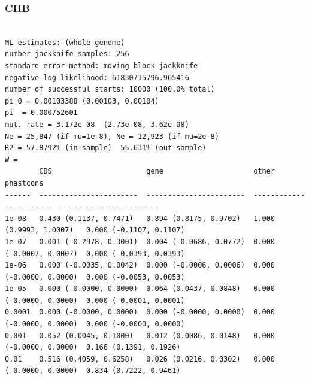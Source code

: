 \documentclass[11pt]{article}
\begin{document}
\subsubsection*{CHB}
\begin{minipage}{\linewidth}\begin{footnotesize}
\begin{verbatim}

ML estimates: (whole genome)
number jackknife samples: 256
standard error method: moving block jackknife
negative log-likelihood: 61830715796.965416
number of successful starts: 10000 (100.0% total)
pi_0 = 0.00103388 (0.00103, 0.00104)
pi  = 0.000752601
mut. rate = 3.172e-08  (2.73e-08, 3.62e-08)
Ne = 25,847 (if mu=1e-8), Ne = 12,923 (if mu=2e-8)
R2 = 57.8792% (in-sample)  55.631% (out-sample)
W = 
        CDS                      gene                     other                    phastcons
------  -----------------------  -----------------------  -----------------------  -----------------------
1e-08   0.430 (0.1137, 0.7471)   0.894 (0.8175, 0.9702)   1.000 (0.9993, 1.0007)   0.000 (-0.1107, 0.1107)
1e-07   0.001 (-0.2978, 0.3001)  0.004 (-0.0686, 0.0772)  0.000 (-0.0007, 0.0007)  0.000 (-0.0393, 0.0393)
1e-06   0.000 (-0.0035, 0.0042)  0.000 (-0.0006, 0.0006)  0.000 (-0.0000, 0.0000)  0.000 (-0.0053, 0.0053)
1e-05   0.000 (-0.0000, 0.0000)  0.064 (0.0437, 0.0848)   0.000 (-0.0000, 0.0000)  0.000 (-0.0001, 0.0001)
0.0001  0.000 (-0.0000, 0.0000)  0.000 (-0.0000, 0.0000)  0.000 (-0.0000, 0.0000)  0.000 (-0.0000, 0.0000)
0.001   0.052 (0.0045, 0.1000)   0.012 (0.0086, 0.0148)   0.000 (-0.0000, 0.0000)  0.166 (0.1391, 0.1926)
0.01    0.516 (0.4059, 0.6258)   0.026 (0.0216, 0.0302)   0.000 (-0.0000, 0.0000)  0.834 (0.7222, 0.9461)
\end{verbatim}
\end{footnotesize}\end{minipage}
\end{document}
